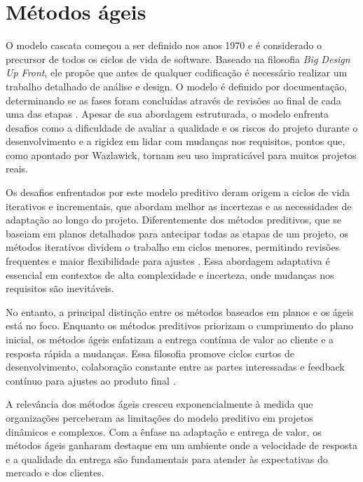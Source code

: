 \documentclass[
	12pt,
	openright,
	twoside,
	a4paper,
	english,
	brazil
	]{abntex2}
\begin{document}

\section{Métodos ágeis}

O modelo cascata começou a ser definido nos anos 1970 e é considerado o precursor de todos os ciclos de vida de software. Baseado na filosofia \textit{Big Design Up Front}, ele propõe que antes de qualquer codificação é necessário realizar um trabalho detalhado de análise e design. O modelo é definido por documentação, determinando se as fases foram concluídas através de revisões ao final de cada uma das etapas \cite{wazlawick2019}. Apesar de sua abordagem estruturada, o modelo enfrenta desafios como a dificuldade de avaliar a qualidade e os riscos do projeto durante o desenvolvimento e a rigidez em lidar com mudanças nos requisitos, pontos que, como apontado por Wazlawick, tornam seu uso impraticável para muitos projetos reais.

Os desafios enfrentados por este modelo preditivo deram origem a ciclos de vida iterativos e incrementais, que abordam melhor as incertezas e as necessidades de adaptação ao longo do projeto. Diferentemente dos métodos preditivos, que se baseiam em planos detalhados para antecipar todas as etapas de um projeto, os métodos iterativos dividem o trabalho em ciclos menores, permitindo revisões frequentes e maior flexibilidade para ajustes \cite{AgileGuide}. Essa abordagem adaptativa é essencial em contextos de alta complexidade e incerteza, onde mudanças nos requisitos são inevitáveis.

No entanto, a principal distinção entre os métodos baseados em planos e os ágeis está no foco. Enquanto os métodos preditivos priorizam o cumprimento do plano inicial, os métodos ágeis enfatizam a entrega contínua de valor ao cliente e a resposta rápida a mudanças. Essa filosofia promove ciclos curtos de desenvolvimento, colaboração constante entre as partes interessadas e feedback contínuo para ajustes ao produto final \cite{AgileGuide}.

A relevância dos métodos ágeis cresceu exponencialmente à medida que organizações perceberam as limitações do modelo preditivo em projetos dinâmicos e complexos. Com a ênfase na adaptação e entrega de valor, os métodos ágeis ganharam destaque em um ambiente onde a velocidade de resposta e a qualidade da entrega são fundamentais para atender às expectativas do mercado e dos clientes.
\end{document}
